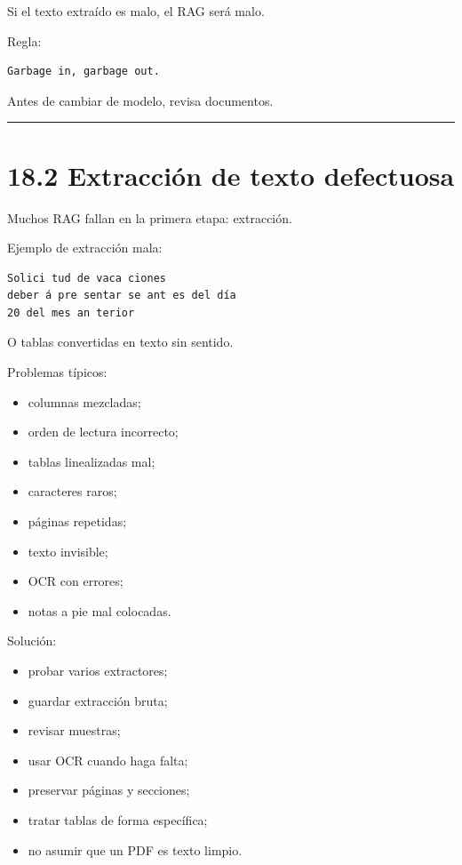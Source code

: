 Si el texto extraído es malo, el RAG será malo.

Regla:

\begin{lstlisting}
Garbage in, garbage out.
\end{lstlisting}

Antes de cambiar de modelo, revisa documentos.

\begin{center}\rule{0.5\linewidth}{0.5pt}\end{center}

\section{18.2 Extracción de texto
defectuosa}\label{extracciuxf3n-de-texto-defectuosa}

Muchos RAG fallan en la primera etapa: extracción.

Ejemplo de extracción mala:

\begin{lstlisting}
Solici tud de vaca ciones
deber á pre sentar se ant es del día
20 del mes an terior
\end{lstlisting}

O tablas convertidas en texto sin sentido.

Problemas típicos:

\begin{itemize}
\tightlist
\item
  columnas mezcladas;
\item
  orden de lectura incorrecto;
\item
  tablas linealizadas mal;
\item
  caracteres raros;
\item
  páginas repetidas;
\item
  texto invisible;
\item
  OCR con errores;
\item
  notas a pie mal colocadas.
\end{itemize}

Solución:

\begin{itemize}
\tightlist
\item
  probar varios extractores;
\item
  guardar extracción bruta;
\item
  revisar muestras;
\item
  usar OCR cuando haga falta;
\item
  preservar páginas y secciones;
\item
  tratar tablas de forma específica;
\item
  no asumir que un PDF es texto limpio.
\end{itemize}

